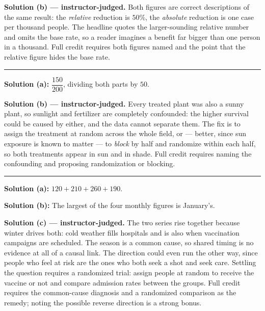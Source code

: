 \documentclass[12pt]{article}
\begin{document}
\textbf{Solution (b) --- instructor-judged.} \quad Both figures are correct descriptions of the
same result: the \emph{relative} reduction is $50\%$, the \emph{absolute} reduction is one case
per thousand people. The headline quotes the larger-sounding relative number and omits the base
rate, so a reader imagines a benefit far bigger than one person in a thousand. Full credit
requires both figures named and the point that the relative figure hides the base rate.

\vspace{0.15cm}\noindent\rule{\linewidth}{0.2pt}\vspace{0.15cm}


\textbf{Solution (a):} \quad $\dfrac{150}{200}$, dividing both parts by $50$. 

\textbf{Solution (b) --- instructor-judged.} \quad Every treated plant was also a sunny plant,
so sunlight and fertilizer are completely confounded: the higher survival could be caused by
either, and the data cannot separate them. The fix is to assign the treatment at random across
the whole field, or --- better, since sun exposure is known to matter --- to \emph{block} by
half and randomize within each half, so both treatments appear in sun and in shade. Full credit
requires naming the confounding and proposing randomization or blocking.

\vspace{0.15cm}\noindent\rule{\linewidth}{0.2pt}\vspace{0.15cm}


\textbf{Solution (a):} \quad $120 + 210 + 260 + 190$. 

\textbf{Solution (b):} \quad The largest of the four monthly figures is January's. 

\textbf{Solution (c) --- instructor-judged.} \quad The two series rise together because winter
drives both: cold weather fills hospitals and is also when vaccination campaigns are scheduled.
The season is a common cause, so shared timing is no evidence at all of a causal link. The
direction could even run the other way, since people who feel at risk are the ones who both
seek a shot and seek care. Settling the question requires a randomized trial: assign people at
random to receive the vaccine or not and compare admission rates between the groups. Full
credit requires the common-cause diagnosis and a randomized comparison as the remedy; noting
the possible reverse direction is a strong bonus.
\end{document}

